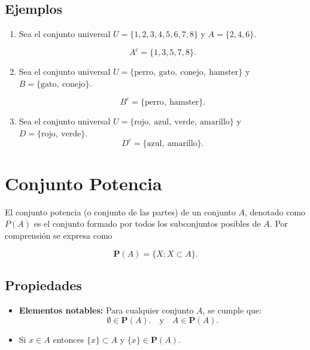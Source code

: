 \documentclass[12pt]{article}
\begin{document}
\subsection*{Ejemplos}
\begin{enumerate}

    \item Sea el conjunto universal \(U = \{1,2,3,4,5,6,7,8\}\)  
    y \(A = \{2,4,6\}\).  
    

  
    \[
    A^{c} = \{1,3,5,7,8\}.
    \]

    \item Sea el conjunto universal  
    \(U = \{\text{perro},\ \text{gato},\ \text{conejo},\ \text{hamster}\}\)  
    y \(B = \{\text{gato},\ \text{conejo}\}\).  
    

   
    \[
    B^{c} = \{\text{perro},\ \text{hamster}\}.
    \]

    \item Sea el conjunto universal 
\(U = \{\text{rojo},\ \text{azul},\ \text{verde},\ \text{amarillo}\}\)  
y \(D = \{\text{rojo},\ \text{verde}\}\).  
\[
D^{c} = \{\text{azul},\ \text{amarillo}\}.
\]
\end{enumerate}




\section{Conjunto Potencia}
El conjunto potencia (o conjunto de las partes) de un conjunto $A$, denotado como $P(A)$ es el conjunto formado por todos los subconjuntos posibles de $A$. Por comprensión se expresa como

$$\mathbf{P}(A)=\{X: X\subset A\}.$$


\subsection*{Propiedades}

\begin{itemize}
    \item \textbf{Elementos notables:} Para cualquier conjunto $A$, se cumple que:
    \[
    \emptyset \in \mathbf{P}(A).\quad \text{y} \quad A \in \mathbf{P}(A).
    \]
    \item Si $x\in A$ entonces $\{x\}\subset A$ y  $\{x\}\in \mathbf{P}(A).$
\end{itemize}
\end{document}
